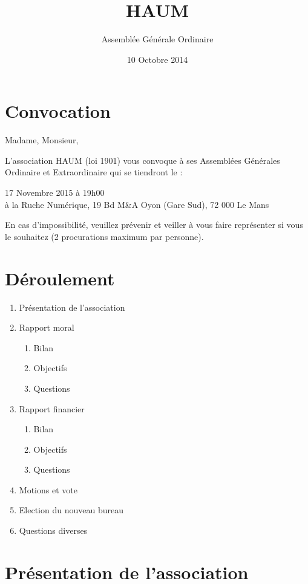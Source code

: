 \documentclass[11pt]{article}
\title{HAUM}
\author{Assemblée Générale Ordinaire}
\date{10 Octobre 2014}
\begin{document}
\maketitle


\section*{Convocation}

Madame, Monsieur,

L'association HAUM (loi 1901) vous convoque à ses Assemblées Générales Ordinaire et Extraordinaire qui se tiendront le :

\begin{center}
{\Large 17 Novembre 2015 à 19h00}\\
à la Ruche Numérique, 19 Bd M\&A Oyon (Gare Sud), 72 000 Le Mans
\end{center}

En cas d'impossibilité, veuillez prévenir et veiller à vous faire représenter si vous le souhaitez (2 procurations maximum par personne).

\section*{Déroulement}

\begin{enumerate}
    \item Présentation de l'association
    \item Rapport moral
        \begin{enumerate}
            \item Bilan
            \item Objectifs
            \item Questions
        \end{enumerate}
    \item Rapport financier
        \begin{enumerate}
            \item Bilan
            \item Objectifs
            \item Questions
        \end{enumerate}
    \item Motions et vote
    \item Election du nouveau bureau
    \item Questions diverses
\end{enumerate}

\section{Présentation de l'association}
\end{document}
